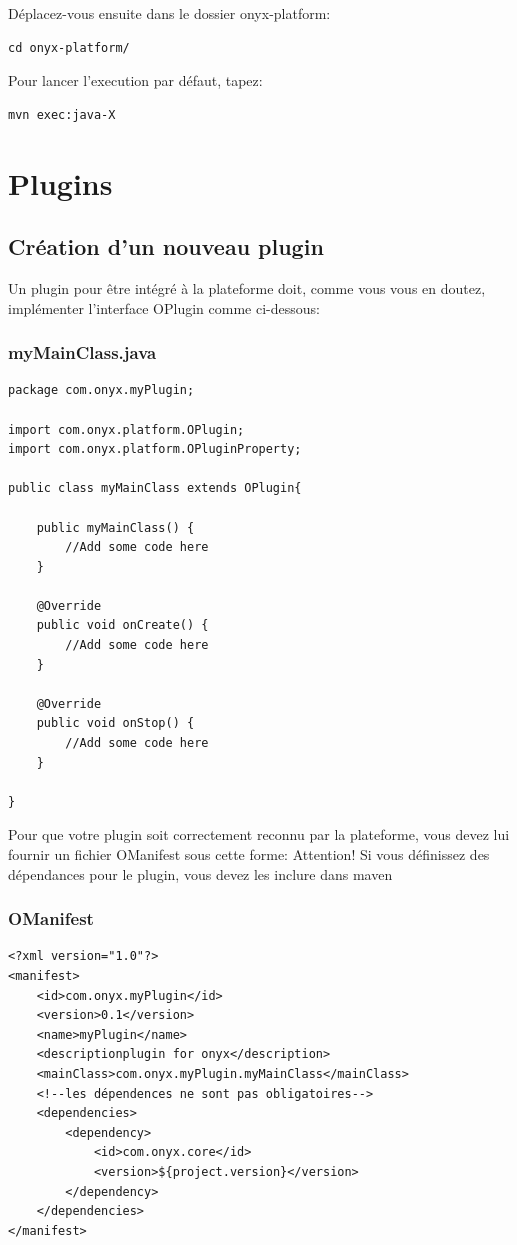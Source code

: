 Déplacez-vous ensuite dans le dossier onyx-platform:
\begin{verbatim}
cd onyx-platform/
\end{verbatim}

Pour lancer l'execution par défaut, tapez:
\begin{verbatim}
mvn exec:java-X
\end{verbatim}

\newpage
\section{Plugins}

\subsection{Création d'un nouveau plugin}

Un plugin pour être intégré à la plateforme doit, comme vous vous en doutez, implémenter l'interface OPlugin comme ci-dessous:
\subsubsection{myMainClass.java}
\begin{verbatim}
package com.onyx.myPlugin;

import com.onyx.platform.OPlugin;
import com.onyx.platform.OPluginProperty;

public class myMainClass extends OPlugin{

    public myMainClass() {
        //Add some code here
    }

    @Override
    public void onCreate() {
        //Add some code here
    }

    @Override
    public void onStop() {
        //Add some code here
    }

}
\end{verbatim}

Pour que votre plugin soit correctement reconnu par la plateforme, vous devez lui fournir un fichier OManifest sous cette forme:
Attention! Si vous définissez des dépendances pour le plugin, vous devez les inclure dans maven
\subsubsection{OManifest}
\begin{verbatim}
<?xml version="1.0"?>
<manifest>
    <id>com.onyx.myPlugin</id>
    <version>0.1</version>
    <name>myPlugin</name>
    <descriptionplugin for onyx</description>
    <mainClass>com.onyx.myPlugin.myMainClass</mainClass>
    <!--les dépendences ne sont pas obligatoires-->
    <dependencies>
        <dependency>
            <id>com.onyx.core</id>
            <version>${project.version}</version>
        </dependency>
    </dependencies>
</manifest>
\end{verbatim}

